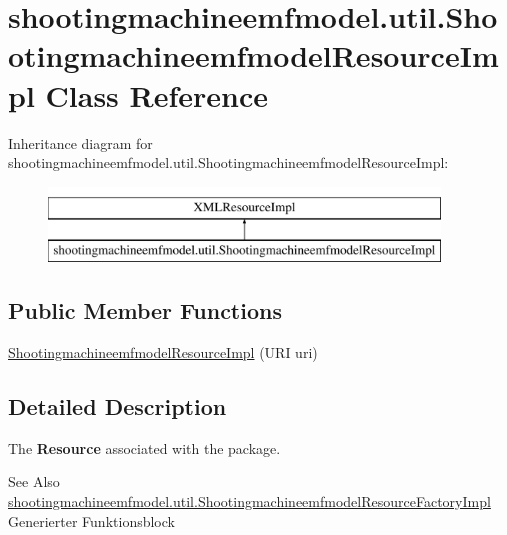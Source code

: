 \hypertarget{classshootingmachineemfmodel_1_1util_1_1_shootingmachineemfmodel_resource_impl}{\section{shootingmachineemfmodel.\-util.\-Shootingmachineemfmodel\-Resource\-Impl Class Reference}
\label{classshootingmachineemfmodel_1_1util_1_1_shootingmachineemfmodel_resource_impl}
}
Inheritance diagram for shootingmachineemfmodel.\-util.\-Shootingmachineemfmodel\-Resource\-Impl\-:\begin{figure}[H]
\begin{center}
\leavevmode
\includegraphics[height=2.000000cm]{classshootingmachineemfmodel_1_1util_1_1_shootingmachineemfmodel_resource_impl}
\end{center}
\end{figure}
\subsection*{Public Member Functions}
\begin{DoxyCompactItemize}
\item 
\hyperlink{classshootingmachineemfmodel_1_1util_1_1_shootingmachineemfmodel_resource_impl_a69ebeef063ff892d656d5eb7e36c409a}{Shootingmachineemfmodel\-Resource\-Impl} (U\-R\-I uri)
\end{DoxyCompactItemize}


\subsection{Detailed Description}
The {\bfseries Resource } associated with the package.

\begin{DoxySeeAlso}{See Also}
\hyperlink{classshootingmachineemfmodel_1_1util_1_1_shootingmachineemfmodel_resource_factory_impl}{shootingmachineemfmodel.\-util.\-Shootingmachineemfmodel\-Resource\-Factory\-Impl} Generierter Funktionsblock 
\end{DoxySeeAlso}


